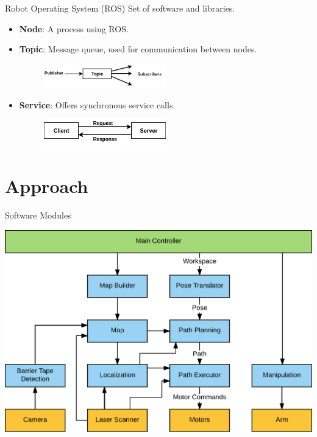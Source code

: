 \documentclass[12pt,aspectratio=43,xcolor={usenames,dvipsnames,table}]{beamer}
\begin{document}
\begin{frame}{Robot Operating System (ROS)}
Set of software and libraries.
\begin{itemize}
    \item \textbf{Node}: A process using ROS. 
    \item \textbf{Topic}: Message queue, used for communication between nodes.
    \begin{figure}
        \includegraphics[width=0.5\textwidth]{gfx/topic.png}
    \end{figure}
    \item \textbf{Service}: Offers synchronous service calls.
    \begin{figure}
        \includegraphics[width=0.5\textwidth]{gfx/service.png}
    \end{figure}
\end{itemize}
\end{frame}

\section{Approach}
\begin{frame}{Software Modules}
    \begin{center}
        \includegraphics[width=\linewidth,height=0.9\textheight,keepaspectratio]{gfx/software_modules.pdf}
    \end{center}
\end{frame}
\end{document}
